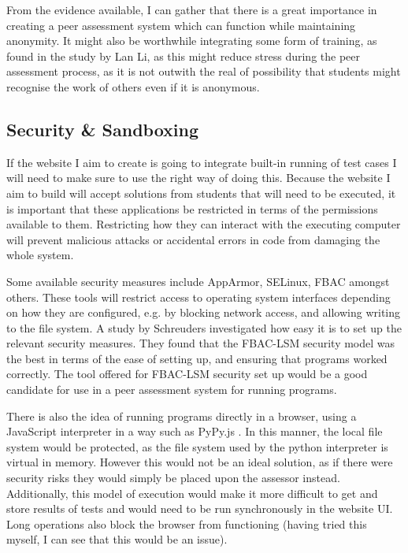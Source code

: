 \documentclass[a4paper,11pt]{report}
\begin{document}
From the evidence available, I can gather that there is a great importance in creating a peer assessment system which can function while maintaining anonymity. It might also be worthwhile integrating some form of training, as found in the study by Lan Li, as this might reduce stress during the peer assessment process, as it is not outwith the real of possibility that students might recognise the work of others even if it is anonymous.

\subsection{Security \& Sandboxing}
\label{subsec:security}
If the website I aim to create is going to integrate built-in running of test cases I will need to make sure to use the right way of doing this. Because the website I aim to build will accept solutions from students that will need to be executed, it is important that these applications be restricted in terms of the permissions available to them. Restricting how they can interact with the executing computer will prevent malicious attacks or accidental errors in code from damaging the whole system.\par
Some available security measures include AppArmor, SELinux, FBAC amongst others. These tools will restrict access to operating system interfaces depending on how they are configured, e.g. by blocking network access, and allowing writing to the file system. A study by Schreuders \cite{schreuders_empowering_2011} investigated how easy it is to set up the relevant security measures.  They found that the FBAC-LSM security model was the best in terms of the ease of setting up, and ensuring that programs worked correctly. The tool offered for FBAC-LSM security set up would be a good candidate for use in a peer assessment system for running programs.\par
There is also the idea of running programs directly in a browser, using a JavaScript interpreter in a way such as PyPy.js \cite{pypy.js_web_2016}. In this manner, the local file system would be protected, as the file system used by the python interpreter is virtual in memory. However this would not be an ideal solution, as if there were security risks they would simply be placed upon the assessor instead. Additionally, this model of execution would make it more difficult to get and store results of tests and would need to be run synchronously in the website UI. Long operations also block the browser from functioning (having tried this myself, I can see that this would be an issue).\par
\end{document}
